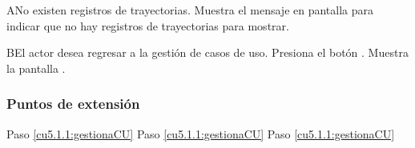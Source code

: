  \begin{UCtrayectoriaA}{A}{No existen registros de trayectorias.}
    \UCpaso[\UCsist] Muestra el mensaje  en pantalla  
    para indicar que no hay registros de trayectorias para mostrar.
 \end{UCtrayectoriaA}
 
 \begin{UCtrayectoriaA}{B}{El actor desea regresar a la gestión de casos de uso.}
    \UCpaso[\UCactor] Presiona el botón .
    \UCpaso[\UCsist] Muestra la pantalla .
 \end{UCtrayectoriaA}
 
\subsubsection{Puntos de extensión}

	{Paso \ref{cu5.1.1:gestionaCU}}
	{}
	{Paso \ref{cu5.1.1:gestionaCU}}
	{}
	{Paso \ref{cu5.1.1:gestionaCU}}
	{}
  